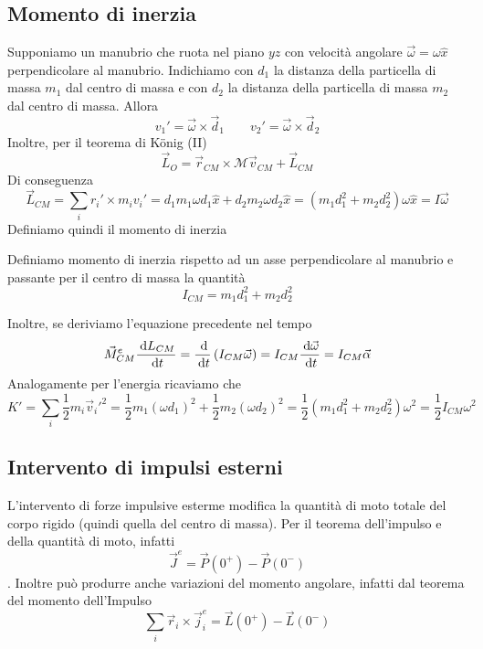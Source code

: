 \documentclass{article}
\theoremstyle{plain}
\begin{document}
\subsection{Momento di inerzia}
Supponiamo un manubrio che ruota nel piano $yz$ con velocità angolare $\vec \omega=\omega \hat x$ perpendicolare al manubrio. Indichiamo con $d_1$ la distanza della particella di massa $m_1$ dal centro di massa e con $d_2$ la distanza della particella di massa $m_2$ dal centro di massa.
Allora
\[v_1' =\vec\omega \times \vec d_1\qquad v_2' =\vec\omega \times \vec d_2\]
Inoltre, per il teorema di König (II) 
\[\vec L_O = \vec r_{CM} \times \mathcal M \vec v_{CM} + \vec L_{CM}\]
Di conseguenza
\[\vec L_{CM} = \sum_ir_i' \times m_iv_i' = d_1m_1\omega d_1\hat x + d_2m_2\omega d_2\hat x = \left( m_1d_1^2 + m_2d^2_2 \right)\omega \hat x = I\vec \omega\]
Definiamo quindi il momento di inerzia
\begin{boxdef}
    Definiamo momento di inerzia rispetto ad un asse perpendicolare al manubrio e passante per il centro di massa la quantità
    \[I_{CM} = m_1d_1^2 + m_2d_2^2\]
\end{boxdef}
Inoltre, se deriviamo l'equazione precedente nel tempo
\[\vec M_{CM}^e\frac{\:\text{d} L_{CM}}{\:\text{d} t} = \frac{\:\text{d}}{\:\text{d} t}\left( I_{CM} \vec \omega\right) = I_{CM} \frac{\:\text{d} \vec \omega}{\:\text{d} t} = I_{CM}\vec \alpha\]
Analogamente per l'energia ricaviamo che 
\[K' = \sum_i \frac{1}{2}m_i\vec v_i'^2 = \frac{1}{2} m_1(\omega d_1)^2 + \frac{1}{2} m_2(\omega d_2)^2 = \frac{1}{2} \left( m_1 d_1^2 + m_2d_2^2 \right)\omega^2 = \frac{1}{2}I_{CM}\omega^2\]

\subsection{Intervento di impulsi esterni}
L'intervento di forze impulsive esterme modifica la quantità di moto totale del corpo rigido (quindi quella del centro di massa). Per il teorema dell'impulso e della quantità di moto, infatti
\[\vec J^e = \vec P(0^ +) - \vec P(0^ -)\]
. Inoltre può produrre anche variazioni del momento angolare, infatti dal teorema del momento dell'Impulso
\[\sum_i\vec r_i \times \vec j_i^e = \vec L(0^ +) - \vec L(0^ -)\]
\end{document}

